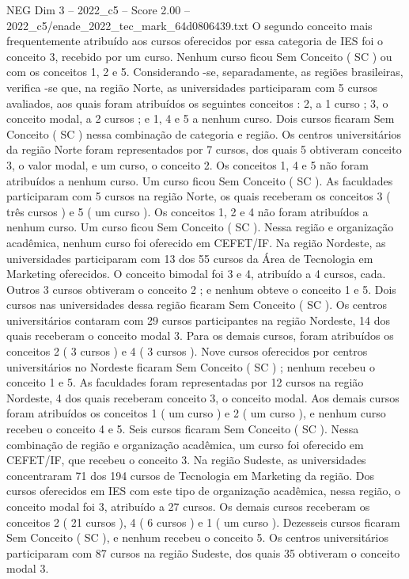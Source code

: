 \begin{textsample}{NEG Dim 3 – 2022\_c5 – Score 2.00 – 2022\_c5/enade\_2022\_tec\_mark\_64d0806439.txt}
O segundo conceito mais frequentemente atribuído aos cursos oferecidos por essa categoria de IES foi o conceito 3, recebido por um curso.
Nenhum curso ficou Sem Conceito ( SC ) ou com os conceitos 1, 2 e 5.
Considerando -se, separadamente, as regiões brasileiras, verifica -se que, na região Norte, as universidades participaram com 5 cursos avaliados, aos quais foram atribuídos os seguintes conceitos : 2, a 1 curso ; 3, o conceito modal, a 2 cursos ; e 1, 4 e 5 a nenhum curso.
Dois cursos ficaram Sem Conceito ( SC ) nessa combinação de categoria e região.
Os centros universitários da região Norte foram representados por 7 cursos, dos quais 5 obtiveram conceito 3, o valor modal, e um curso, o conceito 2.
Os conceitos 1, 4 e 5 não foram atribuídos a nenhum curso.
Um curso ficou Sem Conceito ( SC ).
As faculdades participaram com 5 cursos na região Norte, os quais receberam os conceitos 3 ( três cursos ) e 5 ( um curso ).
Os conceitos 1, 2 e 4 não foram atribuídos a nenhum curso.
Um curso ficou Sem Conceito ( SC ).
Nessa região e organização acadêmica, nenhum curso foi oferecido em CEFET/IF.
Na região Nordeste, as universidades participaram com 13 dos 55 cursos da Área de Tecnologia em Marketing oferecidos.
O conceito bimodal foi 3 e 4, atribuído a 4 cursos, cada.
Outros 3 cursos obtiveram o conceito 2 ; e nenhum obteve o conceito 1 e 5.
Dois cursos nas universidades dessa região ficaram Sem Conceito ( SC ).
Os centros universitários contaram com 29 cursos participantes na região Nordeste, 14 dos quais receberam o conceito modal 3.
Para os demais cursos, foram atribuídos os conceitos 2 ( 3 cursos ) e 4 ( 3 cursos ).
Nove cursos oferecidos por centros universitários no Nordeste ficaram Sem Conceito ( SC ) ; nenhum recebeu o conceito 1 e 5.
As faculdades foram representadas por 12 cursos na região Nordeste, 4 dos quais receberam conceito 3, o conceito modal.
Aos demais cursos foram atribuídos os conceitos 1 ( um curso ) e 2 ( um curso ), e nenhum curso recebeu o conceito 4 e 5.
Seis cursos ficaram Sem Conceito ( SC ).
Nessa combinação de região e organização acadêmica, um curso foi oferecido em CEFET/IF, que recebeu o conceito 3.
Na região Sudeste, as universidades concentraram 71 dos 194 cursos de Tecnologia em Marketing da região.
Dos cursos oferecidos em IES com este tipo de organização acadêmica, nessa região, o conceito modal foi 3, atribuído a 27 cursos.
Os demais cursos receberam os conceitos 2 ( 21 cursos ), 4 ( 6 cursos ) e 1 ( um curso ).
Dezesseis cursos ficaram Sem Conceito ( SC ), e nenhum recebeu o conceito 5.
Os centros universitários participaram com 87 cursos na região Sudeste, dos quais 35 obtiveram o conceito modal 3.

\end{textsample}
